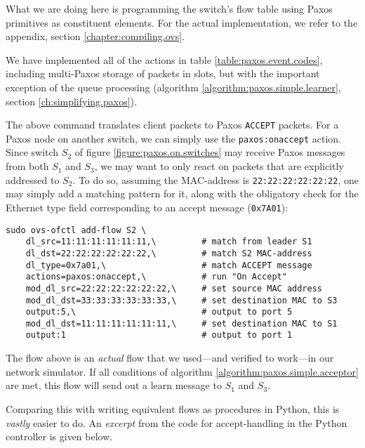 What we are doing here is programming the switch's flow table using Paxos
primitives as constituent elements.  For the actual implementation, we refer
to the appendix, section \vref{chapter:compiling.ovs}.

We have implemented all of the actions in table
\ref{table:paxos.event.codes}, including multi-Paxos storage of packets in
slots, but with the important exception of the queue processing (algorithm
\ref{algorithm:paxos.simple.learner}, section
\ref{ch:simplifying.paxos}).

The above command translates client packets to Paxos \texttt{ACCEPT}
packets.  For a Paxos node on another switch, we can simply use the
\texttt{paxos:onaccept} action.  Since switch $S_2$ of figure
\vref{figure:paxos.on.switches} may receive Paxos messages from both $S_1$
and $S_3$, we may want to only react on packets that are explicitly
addressed to $S_2$.
%
To do so, assuming the MAC-address is \texttt{22:22:22:22:22:22}, one may
simply add a matching pattern for it, along with the obligatory check for
the Ethernet type field corresponding to an accept message
(\texttt{0x7A01}):

\begin{Verbatim}
sudo ovs-ofctl add-flow S2 \
    dl_src=11:11:11:11:11:11,\         # match from leader S1
    dl_dst=22:22:22:22:22:22,\         # match S2 MAC-address
    dl_type=0x7a01,\                   # match ACCEPT message
    actions=paxos:onaccept,\           # run "On Accept"
    mod_dl_src=22:22:22:22:22:22,\     # set source MAC address
    mod_dl_dst=33:33:33:33:33:33,\     # set destination MAC to S3
    output:5,\                         # output to port 5
    mod_dl_dst=11:11:11:11:11:11,\     # set destination MAC to S1
    output:1                           # output to port 1
\end{Verbatim}

The flow above is an \textit{actual} flow that we used---and verified to
work---in our network simulator.  If all conditions of algorithm
\ref{algorithm:paxos.simple.acceptor} are met, this flow will send out a
learn message to $S_1$ and $S_3$.

Comparing this with writing equivalent flows as procedures in Python, this
is \textit{vastly} easier to do.  An \textit{excerpt} from the code for
accept-handling in the Python controller is given below.

